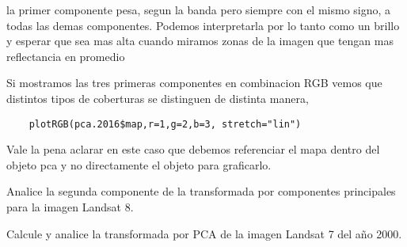 \begin{exa}
    la primer componente pesa, segun la banda pero siempre con el mismo signo, a
    todas las demas componentes. Podemos interpretarla por lo tanto como un
    brillo y esperar que sea mas alta cuando miramos  zonas de la imagen que
    tengan mas reflectancia en promedio

    Si mostramos las tres primeras componentes en combinacion RGB vemos que
    distintos tipos de coberturas se distinguen de distinta manera,

    \begin{lstlisting}
    plotRGB(pca.2016$map,r=1,g=2,b=3, stretch="lin")
    \end{lstlisting}

    Vale la pena aclarar en este caso que debemos referenciar el mapa dentro del
    objeto pca y no directamente el objeto para graficarlo.
\end{exa}

\begin{act}
    Analice la segunda componente de la transformada por componentes principales
    para la imagen Landsat 8.
\end{act}

\begin{act}
    Calcule y analice la transformada por PCA de la imagen Landsat 7 del año
    2000.
\end{act}

